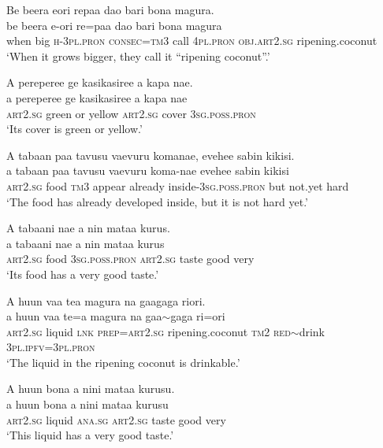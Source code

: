 \ea\label{ex:text01-37}
Be beera eori repaa dao bari bona magura.\\
\gll be	beera	e-ori	re=paa	dao	bari	bona	magura\\
     when	big	\textsc{h}-3\textsc{pl}.\textsc{pron}	\textsc{consec}=\textsc{tm}3	call	4\textsc{pl}.\textsc{pron}	\textsc{obj}.\textsc{art}2.\textsc{sg}	ripening.coconut\\
\glt `When it grows bigger, they call it ``ripening coconut''.'
\z

\ea\label{ex:text01-38}
A pereperee ge kasikasiree a kapa nae.\\
\gll a	pereperee	ge	kasikasiree	a	kapa	nae\\
     \textsc{art}2.\textsc{sg}	green	or	yellow	\textsc{art}2.\textsc{sg}	cover	3\textsc{sg}.\textsc{poss}.\textsc{pron}\\
\glt `Its cover is green or yellow.'
\z

\ea\label{ex:text01-39}
A tabaan paa tavusu vaevuru komanae, evehee sabin kikisi.\\
\gll a	tabaan	paa	tavusu	vaevuru	koma-nae	evehee	sabin	kikisi\\
     \textsc{art}2.\textsc{sg}	food	\textsc{tm}3	appear	already	inside-3\textsc{sg}.\textsc{poss}.\textsc{pron}	but	not.yet	hard\\
\glt `The food has already developed inside, but it is not hard yet.'
\z

\ea\label{ex:text01-40}
A tabaani nae a nin mataa kurus.\\
\gll a	tabaani	nae	a	nin	mataa	kurus\\
     \textsc{art}2.\textsc{sg}	food	3\textsc{sg}.\textsc{poss}.\textsc{pron}	\textsc{art}2.\textsc{sg}	taste	good	very\\
\glt `Its food has a very good taste.'
\z

\newpage
\ea\label{ex:text01-41}
A huun vaa tea magura na gaagaga riori.\\
\gll a	huun	vaa	te=a	magura	na	gaa{$\sim$}gaga	ri=ori\\
     \textsc{art}2.\textsc{sg}	liquid	\textsc{lnk}	\textsc{prep}=\textsc{art}2.\textsc{sg}	ripening.coconut	\textsc{tm}2	\textsc{red}{$\sim$}drink	3\textsc{pl}.\textsc{ipfv}=3\textsc{pl}.\textsc{pron}\\
\glt `The liquid in the ripening coconut is drinkable.'
\z

\ea\label{ex:text01-42}
A huun bona a nini mataa kurusu.\\
\gll a	huun	bona	a	nini	mataa	kurusu\\
     \textsc{art}2.\textsc{sg}	liquid	\textsc{ana}.\textsc{sg}	\textsc{art}2.\textsc{sg}	taste	good	very\\
\glt `This liquid has a very good taste.'
\z

